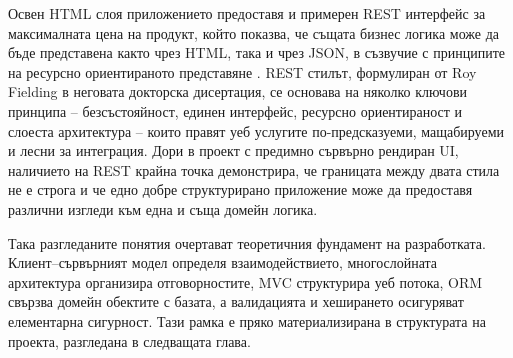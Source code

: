 Освен HTML слоя приложението предоставя и примерен REST интерфейс за максималната цена на продукт, който показва, че същата бизнес логика може да бъде представена както чрез HTML, така и чрез JSON, в съзвучие с принципите на ресурсно ориентираното представяне \cite{fielding}. REST стилът, формулиран от Roy Fielding в неговата докторска дисертация, се основава на няколко ключови принципа -- безсъстояйност, единен интерфейс, ресурсно ориентираност и слоеста архитектура -- които правят уеб услугите по-предсказуеми, мащабируеми и лесни за интеграция. Дори в проект с предимно сървърно рендиран UI, наличието на REST крайна точка демонстрира, че границата между двата стила не е строга и че едно добре структурирано приложение може да предоставя различни изгледи към една и съща домейн логика.

Така разгледаните понятия очертават теоретичния фундамент на разработката. Клиент--сървърният модел определя взаимодействието, многослойната архитектура организира отговорностите, MVC структурира уеб потока, ORM свързва домейн обектите с базата, а валидацията и хеширането осигуряват елементарна сигурност. Тази рамка е пряко материализирана в структурата на проекта, разгледана в следващата глава.
